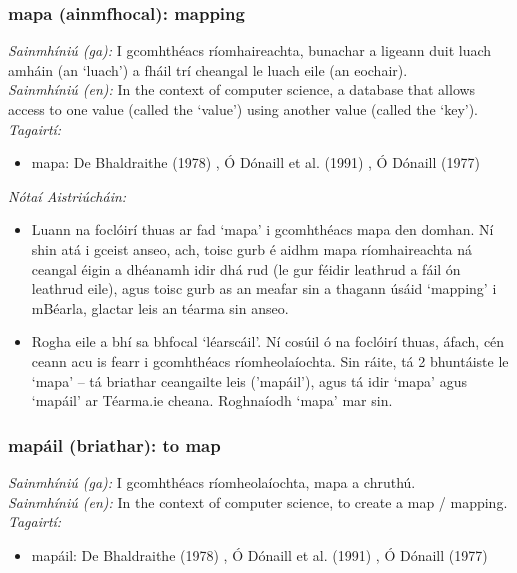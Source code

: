 \subsubsection*{mapa (ainmfhocal): mapping}
 \noindent \textit{Sainmhíniú (ga):} I gcomhthéacs ríomhaireachta, bunachar a ligeann duit luach amháin (an `luach') a fháil trí cheangal le luach eile (an eochair).
\\
 \noindent \textit{Sainmhíniú (en):} In the context of computer science, a database that allows access to one value (called the `value') using another value (called the `key').
\\
 \noindent \textit{Tagairtí:}
\begin{itemize}
	\item mapa: De Bhaldraithe (1978) \cite{de-bhaldraithe}, Ó Dónaill et al. (1991) \cite{focloir-beag}, Ó Dónaill (1977) \cite{odonaill}
\end{itemize}

 \noindent \textit{Nótaí Aistriúcháin:}
\begin{itemize}
	\item Luann na foclóirí thuas ar fad `mapa' i gcomhthéacs mapa den domhan. Ní shin atá i gceist anseo, ach, toisc gurb é aidhm mapa ríomhaireachta ná ceangal éigin a dhéanamh idir dhá rud (le gur féidir leathrud a fáil ón leathrud eile), agus toisc gurb as an meafar sin a thagann úsáid `mapping' i mBéarla, glactar leis an téarma sin anseo.
	\item Rogha eile a bhí sa bhfocal `léarscáil'. Ní cosúil ó na foclóirí thuas, áfach, cén ceann acu is fearr i gcomhthéacs ríomheolaíochta. Sin ráite, tá 2 bhuntáiste le `mapa' -- tá briathar ceangailte leis ('mapáil'), agus tá idir `mapa' agus `mapáil' ar Téarma.ie cheana. Roghnaíodh `mapa' mar sin.
\end{itemize}


\subsubsection*{mapáil (briathar): to map}
 \noindent \textit{Sainmhíniú (ga):} I gcomhthéacs ríomheolaíochta, mapa a chruthú.
\\
 \noindent \textit{Sainmhíniú (en):} In the context of computer science, to create a map / mapping.
\\
 \noindent \textit{Tagairtí:}
\begin{itemize}
	\item mapáil: De Bhaldraithe (1978) \cite{de-bhaldraithe}, Ó Dónaill et al. (1991) \cite{focloir-beag}, Ó Dónaill (1977) \cite{odonaill}
\end{itemize}

